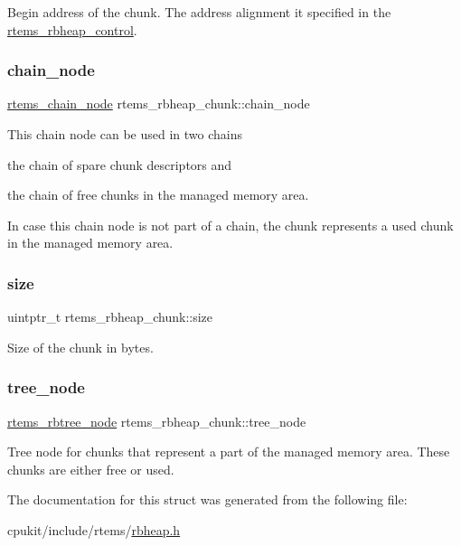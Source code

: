 Begin address of the chunk. The address alignment it specified in the \mbox{\hyperlink{structrtems__rbheap__control}{rtems\+\_\+rbheap\+\_\+control}}. \mbox{\label{structrtems__rbheap__chunk_a90db6a3d0682d916970e68d748478bb5}} 
\subsubsection{\texorpdfstring{chain\_node}{chain\_node}}
{\footnotesize\ttfamily \mbox{\hyperlink{structChain__Node__struct}{rtems\+\_\+chain\+\_\+node}} rtems\+\_\+rbheap\+\_\+chunk\+::chain\+\_\+node}

This chain node can be used in two chains
\begin{DoxyItemize}
\item the chain of spare chunk descriptors and
\item the chain of free chunks in the managed memory area.
\end{DoxyItemize}

In case this chain node is not part of a chain, the chunk represents a used chunk in the managed memory area. \mbox{\label{structrtems__rbheap__chunk_a00639c28a15cc063da3de4cd9fdac830}} 
\subsubsection{\texorpdfstring{size}{size}}
{\footnotesize\ttfamily uintptr\+\_\+t rtems\+\_\+rbheap\+\_\+chunk\+::size}

Size of the chunk in bytes. \mbox{\label{structrtems__rbheap__chunk_ae87ec9bb978c75ad6feceed2eb0f3785}} 
\subsubsection{\texorpdfstring{tree\_node}{tree\_node}}
{\footnotesize\ttfamily \mbox{\hyperlink{group__ClassicRBTrees_gaef47fc7fc61856c9afbf7f18a26ff80d}{rtems\+\_\+rbtree\+\_\+node}} rtems\+\_\+rbheap\+\_\+chunk\+::tree\+\_\+node}

Tree node for chunks that represent a part of the managed memory area. These chunks are either free or used. 

The documentation for this struct was generated from the following file\+:\begin{DoxyCompactItemize}
\item 
cpukit/include/rtems/\mbox{\hyperlink{rbheap_8h}{rbheap.\+h}}\end{DoxyCompactItemize}
